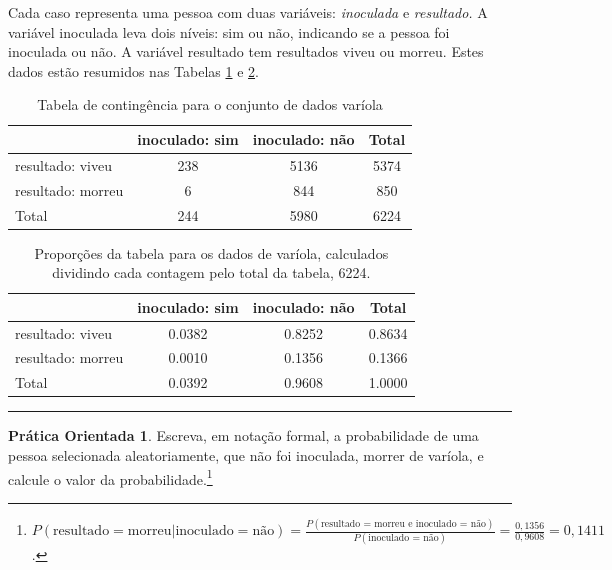 \documentclass[
]{book}
\theoremstyle{definition}
\theoremstyle{definition}
\theoremstyle{definition}
\newtheorem{exercise}{Prática Orientada}[chapter]
\theoremstyle{definition}
\theoremstyle{remark}
\begin{document}
Cada caso representa uma pessoa com duas variáveis: \emph{inoculada} e \emph{resultado.} A variável inoculada leva dois níveis: sim ou não, indicando se a pessoa foi inoculada ou não. A variável resultado tem resultados viveu ou morreu. Estes dados estão resumidos nas Tabelas \ref{tab:smallpoxContingencyTable} e \ref{tab:smallpoxProbabilityTable}.

\begin{table}

\caption{\label{tab:smallpoxContingencyTable}Tabela de contingência para o conjunto de dados varíola}
\centering
\begin{tabular}[t]{l|c|c|c}
\hline
  & inoculado: sim & inoculado: não & Total\\
\hline
resultado: viveu & 238 & 5136 & 5374\\
\hline
resultado: morreu & 6 & 844 & 850\\
\hline
Total & 244 & 5980 & 6224\\
\hline
\end{tabular}
\end{table}

\begin{table}

\caption{\label{tab:smallpoxProbabilityTable}Proporções da tabela para os dados de varíola, calculados dividindo cada contagem pelo total da tabela, 6224.}
\centering
\begin{tabular}[t]{l|c|c|c}
\hline
  & inoculado: sim & inoculado: não & Total\\
\hline
resultado: viveu & 0.0382 & 0.8252 & 0.8634\\
\hline
resultado: morreu & 0.0010 & 0.1356 & 0.1366\\
\hline
Total & 0.0392 & 0.9608 & 1.0000\\
\hline
\end{tabular}
\end{table}

\begin{center}\rule{0.5\linewidth}{0.5pt}\end{center}

\begin{exercise}
\protect\hypertarget{exr:probDiedIfNotInoculated}{}{\label{exr:probDiedIfNotInoculated} }Escreva, em notação formal, a probabilidade de uma pessoa selecionada aleatoriamente, que não foi inoculada, morrer de varíola, e calcule o valor da probabilidade.\footnote{\(P(\text{resultado} = \text{morreu} | \text{inoculado} = \text{não}) = \frac{P(\text{resultado = morreu e inoculado = não})}{P(\text{inoculado = não})} = \frac{0,1356}{0,9608} = 0,1411\).}
\end{exercise}
\end{document}
